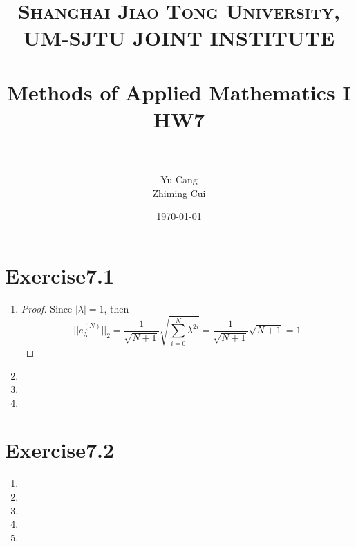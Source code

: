 \documentclass[paper=a4, fontsize=11pt]{scrartcl} %
\title{	
\normalfont \normalsize 
\textsc{Shanghai Jiao Tong University, UM-SJTU JOINT INSTITUTE} \\ [25pt] %
\horrule{0.5pt} \\[0.4cm] %
\huge Methods of Applied Mathematics I\\ HW7 \\ %
\horrule{2pt} \\[0.5cm] %
}
\author{Yu Cang \quad 018370210001\\ Zhiming Cui \quad 017370910006} %
\date{\normalsize \today} %
\numberwithin{equation}{section} %
\numberwithin{figure}{section} %
\numberwithin{table}{section} %
\begin{document}
\maketitle %

\section{Exercise7.1}
	\begin{enumerate}
		\item 
			\begin{proof}
				Since $|\lambda|=1$, then
				\begin{equation}
					||e_\lambda^{(N)}||_2 = \frac{1}{\sqrt{N+1}} \sqrt{\sum_{i=0}^{N} \lambda^{2i}} =  \frac{1}{\sqrt{N+1}} \sqrt{N+1} = 1
				\end{equation}
			\end{proof}
		\item 
			
		\item 
		
		\item 
		
	\end{enumerate}


\section{Exercise7.2}
	\begin{enumerate}
		\item 
		
		\item 
		
		\item 
		
		\item 
		
		\item 
		
	\end{enumerate}
\end{document}
